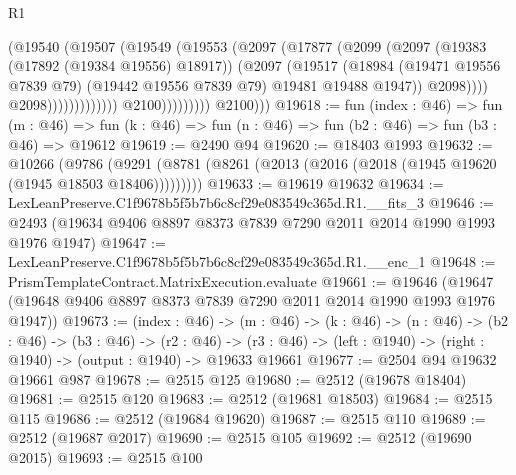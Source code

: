 \begin{lexlean}{R1}
\begin{coremodule}
                                            (@19540
                                              (@19507
                                                (@19549
                                                  (@19553
                                                    (@2097
                                                      (@17877
                                                        (@2099
                                                          (@2097
                                                            (@19383 (@17892 (@19384 @19556) @18917))
                                                            (@2097
                                                              (@19517
                                                                (@18984
                                                                  (@19471 @19556 @7839 @79)
                                                                  (@19442 @19556 @7839 @79)
                                                                  @19481
                                                                  @19488
                                                                  @1947))
                                                              @2098))))
                                                      @2098)))))))))))))
                            @2100)))))))))
          @2100)))
@19618 := fun (index : @46) =>
  fun (m : @46) => fun (k : @46) => fun (n : @46) => fun (b2 : @46) => fun (b3 : @46) => @19612
@19619 := @2490 @94
@19620 := @18403 @1993
@19632 := @10266
    (@9786 (@9291 (@8781 (@8261 (@2013 (@2016 (@2018 (@1945 @19620 (@1945 @18503 @18406)))))))))
@19633 := @19619 @19632
@19634 := LexLeanPreserve.C1f9678b5f5b7b6c8cf29e083549c365d.R1.__fits_3
@19646 := @2493 (@19634 @9406 @8897 @8373 @7839 @7290 @2011 @2014 @1990 @1993 @1976 @1947)
@19647 := LexLeanPreserve.C1f9678b5f5b7b6c8cf29e083549c365d.R1.__enc_1
@19648 := PrismTemplateContract.MatrixExecution.evaluate
@19661 := @19646 (@19647 (@19648 @9406 @8897 @8373 @7839 @7290 @2011 @2014 @1990 @1993 @1976 @1947))
@19673 := (index : @46) ->
  (m : @46) ->
  (k : @46) ->
  (n : @46) ->
  (b2 : @46) ->
  (b3 : @46) ->
  (r2 : @46) -> (r3 : @46) -> (left : @1940) -> (right : @1940) -> (output : @1940) -> @19633 @19661
@19677 := @2504 @94 @19632 @19661 @987
@19678 := @2515 @125
@19680 := @2512 (@19678 @18404)
@19681 := @2515 @120
@19683 := @2512 (@19681 @18503)
@19684 := @2515 @115
@19686 := @2512 (@19684 @19620)
@19687 := @2515 @110
@19689 := @2512 (@19687 @2017)
@19690 := @2515 @105
@19692 := @2512 (@19690 @2015)
@19693 := @2515 @100

\end{coremodule}
\end{lexlean}
